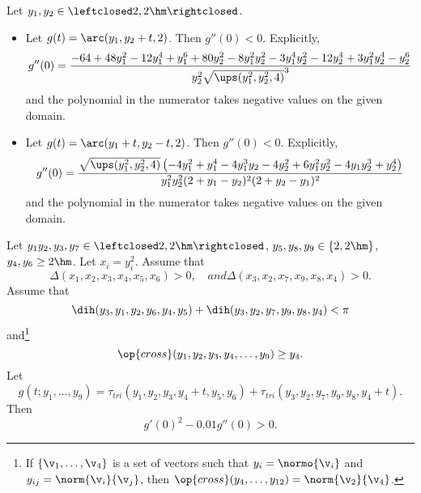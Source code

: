 \begin{calculation}\label{calc:2der}
Let $y_1,y_2\in \leftclosed 2,2\hm\rightclosed$.  
\begin{itemize}
\item 
Let $g(t) = \arc(y_1,y_2+t,2)$.  Then $g''(0) < 0$.
Explicitly,
\begin{displaymath}
  g''(0) = \dfrac{
    -64 + 48y_1^2 - 12 y_1^4 + y_1^6 
  + 80 y_2^2 - 8 y_1^2 y_2^2 - 3 y_1^4 y_2^2
    - 12 y_2 ^4 + 3 y_1^2 y_2^4 - y_2^6
  }{y_2^2 \sqrt{\ups(y_1^2,y_2^2,4)}^3}
\end{displaymath}
and the polynomial in the numerator takes negative values on the given
domain.
\item
Let $g(t) = \arc(y_1+t,y_2-t,2)$.  Then $g''(0) < 0$.
Explicitly,
\begin{displaymath}
  g''(0) = \dfrac{\sqrt{\ups(y_1^2,y_2^2,4)} \left(
      -4 y_1^2 + y_1^4 - 4y_1^3 y_2 - 4y_2^2 
   + 6 y_1^2 y_2^2 - 4 y_1 y_2^3 +y_2^4
    \right)}{y_1^2 y_2^2 (2+y_1-y_2)^2 (2+y_2-y_1)^2}
\end{displaymath}
and the polynomial in the numerator takes negative values on the given
domain.
\end{itemize}
\end{calculation}

\begin{calculation}\label{calc:cc:qua}  %
Let $y_1y_2,y_3,y_7\in \leftclosed 2,2\hm\rightclosed$,
$y_5,y_8,y_9\in \{2,2\hm\}$, $y_4,y_6\ge 2\hm$.
Let $x_i = y_i^2$.
Assume that
\begin{displaymath}
\Delta(x_1,x_2,x_3,x_4,x_5,x_6)>0,\quad{ and }
\Delta(x_3,x_2,x_7,x_9,x_8,x_4)>0.
\end{displaymath}
Assume that
\begin{displaymath}
\dih(y_3,y_1,y_2,y_6,y_4,y_5)+\dih(y_3,y_2,y_7,y_9,y_8,y_4) < \pi
\end{displaymath}
and\footnote{If $\{\v_1,\ldots,\v_4\}$ is a set of vectors such that
$y_i = \normo{\v_i}$ and $y_{ij} = \norm{\v_i}{\v_j}$, then
$\op{cross}(y_4,\ldots,y_{12}) = \norm{\v_2}{\v_4}$.}
\begin{displaymath}
\op{cross}(y_1,y_2,y_3,y_4,\ldots,y_9) \ge y_4.
\end{displaymath}
Let 
\begin{displaymath}g(t;y_1,\ldots,y_9) =
  \tau_{tri}(y_1,y_2,y_3,y_4+t,y_5,y_6)+\tau_{tri}(y_3,y_2,y_7,y_9,y_8,y_4+t).
\end{displaymath}
Then \begin{displaymath}g'(0)^2 - 0.01 g''(0) > 0.\end{displaymath}
\end{calculation}


